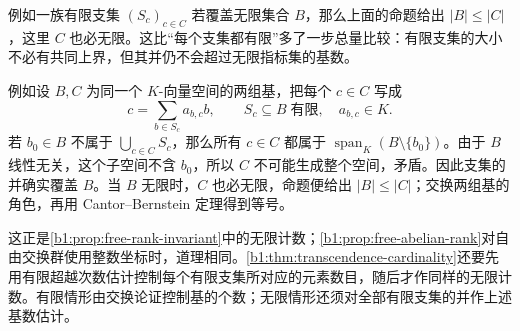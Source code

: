 例如一族有限支集 \((S_c)_{c\in C}\) 若覆盖无限集合 \(B\)，那么上面的命题给出 \(\lvert B\rvert\leq\lvert C\rvert\)，这里 \(C\) 也必无限。这比“每个支集都有限”多了一步总量比较：有限支集的大小不必有共同上界，但其并仍不会超过无限指标集的基数。

\ProseParagraphBreak
例如设 \(B,C\) 为同一个 \(K\)-向量空间的两组基，把每个 \(c\in C\) 写成
\[
	c=\sum_{b\in S_c}a_{b,c}b, \qquad S_c\subseteq B\;\text{有限},\quad a_{b,c}\in K.
\]
若 \(b_0\in B\) 不属于 \(\bigcup_{c\in C}S_c\)，那么所有 \(c\in C\) 都属于 \(\operatorname{span}_K(B\setminus\{b_0\})\)。由于 \(B\) 线性无关，这个子空间不含 \(b_0\)，所以 \(C\) 不可能生成整个空间，矛盾。因此支集的并确实覆盖 \(B\)。当 \(B\) 无限时，\(C\) 也必无限，命题便给出 \(\lvert B\rvert\leq\lvert C\rvert\)；交换两组基的角色，再用 Cantor--Bernstein 定理得到等号。

\ProseParagraphBreak
这正是\cref{b1:prop:free-rank-invariant}中的无限计数；\cref{b1:prop:free-abelian-rank}对自由交换群使用整数坐标时，道理相同。\cref{b1:thm:transcendence-cardinality}还要先用有限超越次数估计控制每个有限支集所对应的元素数目，随后才作同样的无限计数。有限情形由交换论证控制基的个数；无限情形还须对全部有限支集的并作上述基数估计。
